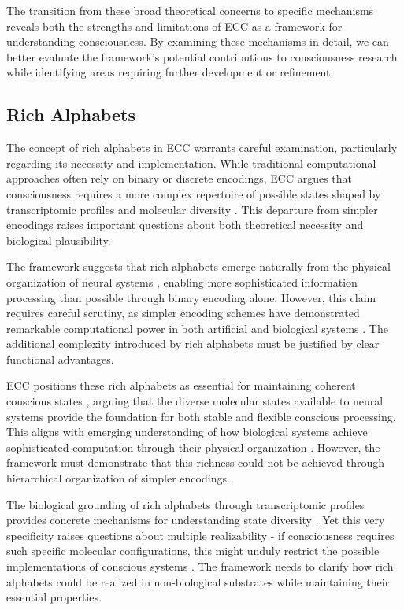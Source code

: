 \begin{refsection}
The transition from these broad theoretical concerns to specific mechanisms reveals both the strengths and limitations of ECC as a framework for understanding consciousness. By examining these mechanisms in detail, we can better evaluate the framework's potential contributions to consciousness research while identifying areas requiring further development or refinement.

\subsection{Rich Alphabets}

The concept of rich alphabets in ECC warrants careful examination, particularly regarding its necessity and implementation. While traditional computational approaches often rely on binary or discrete encodings, ECC argues that consciousness requires a more complex repertoire of possible states shaped by transcriptomic profiles and molecular diversity \cite{koch2019feeling}. This departure from simpler encodings raises important questions about both theoretical necessity and biological plausibility.

The framework suggests that rich alphabets emerge naturally from the physical organization of neural systems \cite{varela2016embodied}, enabling more sophisticated information processing than possible through binary encoding alone. However, this claim requires careful scrutiny, as simpler encoding schemes have demonstrated remarkable computational power in both artificial and biological systems \cite{dennett2017bacteria}. The additional complexity introduced by rich alphabets must be justified by clear functional advantages.

ECC positions these rich alphabets as essential for maintaining coherent conscious states \cite{thompson2014waking}, arguing that the diverse molecular states available to neural systems provide the foundation for both stable and flexible conscious processing. This aligns with emerging understanding of how biological systems achieve sophisticated computation through their physical organization \cite{feinberg2016ancient}. However, the framework must demonstrate that this richness could not be achieved through hierarchical organization of simpler encodings.

The biological grounding of rich alphabets through transcriptomic profiles provides concrete mechanisms for understanding state diversity \cite{churchland2013touching}. Yet this very specificity raises questions about multiple realizability - if consciousness requires such specific molecular configurations, this might unduly restrict the possible implementations of conscious systems \cite{goff2019galileo}. The framework needs to clarify how rich alphabets could be realized in non-biological substrates while maintaining their essential properties.


\end{refsection}

